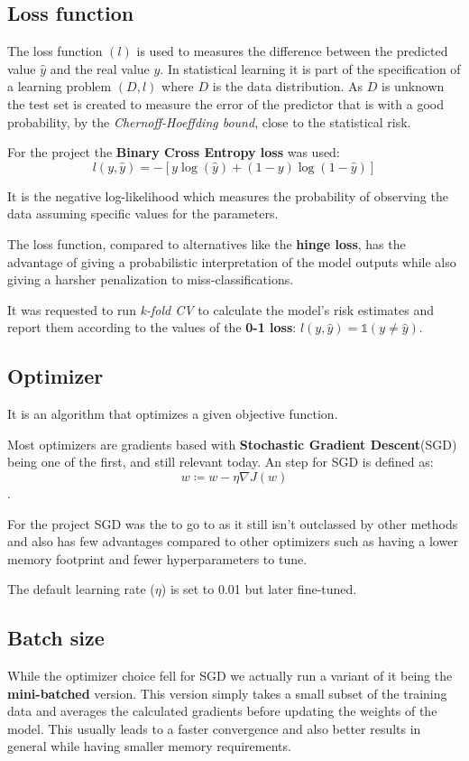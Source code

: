 \subsection{Loss function}
\label{subsec:loss-function-(objective)}
The loss function $(l)$ is used to measures the difference between the predicted value $\hat{y}$ and the real value $y$.
In statistical learning it is part of the specification of a learning problem $(D,l)$ where $D$ is the data distribution.
As $D$ is unknown the test set is created to measure the error
of the predictor that is with a good probability, by the \textit{Chernoff-Hoeffding bound}, close to the statistical risk.\cite{} %

For the project the \textbf{Binary Cross Entropy loss} was used:
\[l(y, \hat{y}) = - [y\log(\hat{y}) + (1 - y)\log(1 - \hat{y})]\]

It is the negative log-likelihood which measures the probability of observing
the data assuming specific values for the parameters.

The loss function, compared to alternatives like the \textbf{hinge loss}, has the advantage of giving a probabilistic
interpretation of the model outputs while also giving a harsher penalization to miss-classifications.

It was requested to run \textit{k-fold CV} to calculate the model's risk estimates and report them according to the values of the \textbf{0-1 loss}:
$l(y,\hat{y}) = \mathds{1}(y \neq \hat{y})$.

\subsection{Optimizer}
\label{subsec:optimizer}
It is an algorithm that optimizes a given objective function.

Most optimizers are gradients based with \textbf{Stochastic Gradient Descent}(SGD) being one of the first, and still relevant today.
An step for SGD is defined as: \[w \coloneqq w - \eta \nabla J(w) \].

For the project SGD was the to go to as it still isn't outclassed by other methods\cite{wilson2018marginal} and also
has few advantages compared to other optimizers such as having a lower memory footprint and fewer hyperparameters\cite{optimzierChoice} to tune.

The default learning rate ($\eta$) is set to 0.01 but later fine-tuned.

\subsection{Batch size}
\label{subsec:batch-size}
While the optimizer choice fell for SGD we actually run a variant of it being the \textbf{mini-batched} version.
This version simply takes a small subset of the training data and averages the calculated gradients before updating the weights of the model.
This usually leads to a faster convergence and also better results in general while having smaller memory requirements.

